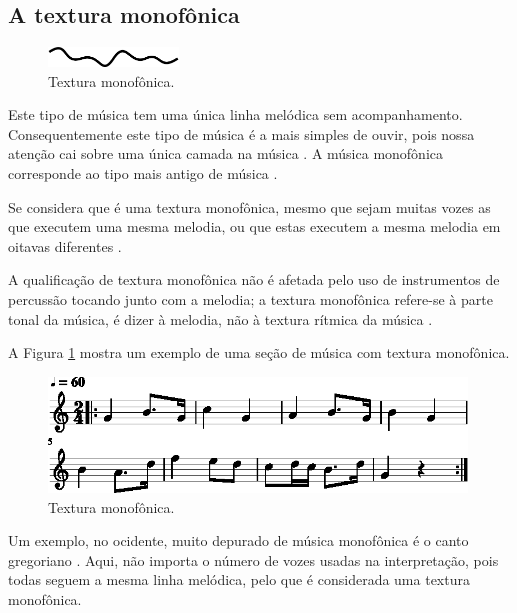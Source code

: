 \subsection{A textura monofônica}
\label{subsec:monofonica}
\begin{figure}
\centering
    \includegraphics[width=0.31\textwidth]{chapters/cap-musicalidade-percepcion/monofonica1.eps}
  \caption{Textura monofônica.}
\end{figure}
Este tipo de música tem uma única linha melódica sem acompanhamento.
Consequentemente este tipo de música é a mais simples de ouvir, 
pois nossa atenção cai sobre uma única camada na música \cite[pp. 77]{copland1974ouvir} \cite[pp. 29]{kerman2015listen}.
A música monofônica corresponde ao tipo mais antigo de música \cite[pp. 539]{apel1969harvard}.

Se considera que é uma textura monofônica, mesmo que sejam muitas vozes as que executem uma mesma melodia, 
ou que estas executem a mesma melodia em oitavas diferentes \cite[pp. 42]{bennett1993elementos} \cite[pp. 58]{holland2013music}.

A qualificação de textura  monofônica não é afetada pelo uso de instrumentos de percussão tocando junto com a melodia;
a textura monofônica refere-se à parte tonal da música, é dizer à melodia, 
não à textura rítmica da música \cite[pp. 58]{holland2013music}.

\begin{example}
A Figura \ref{fig:ex:monofonica} mostra um exemplo de uma seção de música com textura monofônica.
\end{example}

\begin{figure}[!h]
\centering
    \includegraphics[width=0.99\textwidth]{chapters/cap-musicalidade-percepcion/textura-monofonica-1.eps}
  \caption{Textura monofônica.}
\label{fig:ex:monofonica}
\end{figure}
 
\begin{example}
Um exemplo, no ocidente,  muito depurado de música monofônica é o canto gregoriano
\cite[pp. 77]{copland1974ouvir} \cite[pp. 29]{kerman2015listen} \cite[pp. 58]{holland2013music}. 
Aqui, não importa o número de vozes usadas na interpretação,
pois todas seguem a mesma linha melódica, pelo que é considerada uma textura monofônica.
\end{example}

